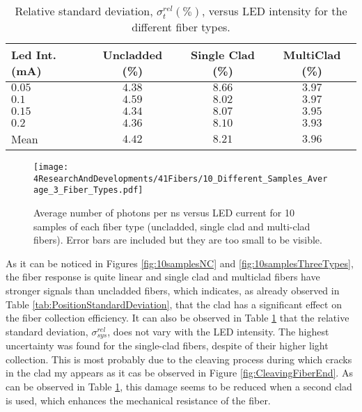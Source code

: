 \begin{table}[h]
\centering{}%
\begin{tabular}{lccc}
\toprule 
Led Int. (mA) & Uncladded (\%) & Single Clad (\%) & MultiClad (\%) \tabularnewline
\midrule
\midrule 
$0.05$ & $4.38$ & $8.66$ & $3.97$ \tabularnewline
$0.1$ & $4.59$ & $8.02$ & $3.97$ \tabularnewline
$0.15$ & $4.34$ & $8.07$ & $3.95$ \tabularnewline
$0.2$ & $4.36$ & $8.10$ & $3.93$ \tabularnewline
\midrule 
Mean & $4.42$ & $8.21$ & $3.96$ \tabularnewline
\bottomrule
\end{tabular}
\caption{Relative standard deviation, $\sigma^{rel}_t(\%)$, versus LED intensity for the different fiber types.}
\label{tab:RelativeStandardDeviation3FiberTypes}
\end{table}

\begin{figure}[h]
\centering
\texttt{[image: 4ResearchAndDevelopments/41Fibers/10\_Different\_Samples\_Average\_3\_Fiber\_Types.pdf]}
\caption{Average number of photons per ns versus LED current for 10 samples of each fiber type (uncladded, single clad and multi-clad fibers). Error bars are included but they are too small to be visible.\label{fig:AveregeThreeFiberTypes}}
\end{figure}

As it can be noticed in Figures \ref{fig:10samplesNC} and \ref{fig:10samplesThreeTypes}, the fiber response is quite linear and single clad and multiclad fibers have stronger signals than uncladded fibers, which indicates, as already observed in Table \ref{tab:PositionStandardDeviation}, that the clad has a significant effect on the fiber collection efficiency. It can also be observed in Table \ref{tab:RelativeStandardDeviation3FiberTypes} that the relative standard deviation, $\sigma^{rel}_{sys}$, does not vary with the LED intensity. The highest uncertainty was found for the single-clad fibers, despite of their higher light collection. This is most probably due to the cleaving process during which cracks in the clad my appears as it cas be observed in Figure \ref{fig:CleavingFiberEnd}. As can be observed in Table \ref{tab:RelativeStandardDeviation3FiberTypes}, this damage seems to be reduced when a second clad is used, which enhances the mechanical resistance of the fiber.


